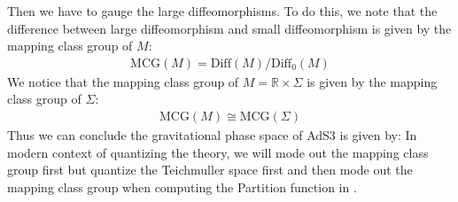 Then we have to gauge the large diffeomorphisms. To do this, we note
that the difference between large diffeomorphism and small
diffeomorphism is given by the mapping class group of $ M $:
\begin{align}
  \text{MCG}(M) = \text{Diff}(M)/\text{Diff}_0(M)
\end{align}
We notice that the mapping class group of $ M = \mathbb{R} \times
\Sigma $ is given by the mapping class group of $ \Sigma $:
\begin{align}
  \text{MCG}(M) \cong \text{MCG}(\Sigma)
\end{align}
Thus we can conclude the gravitational phase space of AdS3 is given by:
In modern context of quantizing the theory, we will mode out the
mapping class group first but quantize the Teichmuller space first
and then mode out the mapping class group when computing the
Partition function in \cite{collierSolving3dGravity2023}.
